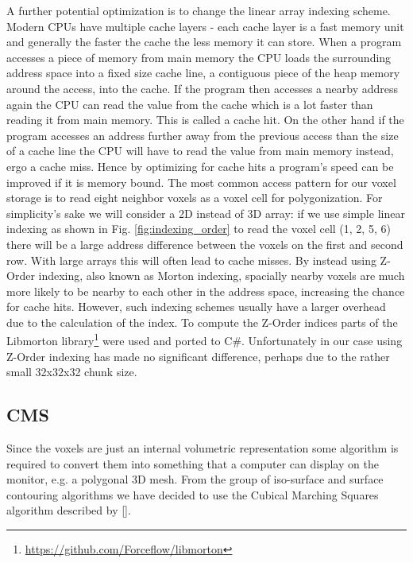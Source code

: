 A further potential optimization is to change the linear array indexing scheme. Modern CPUs have multiple cache layers - each cache layer is a fast memory unit and generally the faster the cache the less
memory it can store. When a program accesses a piece of memory from main memory the CPU loads the surrounding address space into a fixed size cache line, a contiguous piece of the heap memory around the access, into the cache.
If the program then accesses a nearby address again the CPU can read the value from the cache which is a lot faster than reading it from main memory. This is called a cache hit. On the other hand if the program accesses an address further away from the previous access than the size of a cache line the CPU will have to read the value from main memory instead, ergo a cache miss. Hence by optimizing for cache hits a program's speed can be improved if it is memory bound. The most
common access pattern for our voxel storage is to read eight neighbor voxels as a voxel cell for polygonization.
For simplicity's sake we will consider a 2D instead of 3D array: if we use simple linear indexing as shown in Fig. \ref{fig:indexing_order} to read the voxel cell (1, 2, 5, 6) there will be a large address difference between the voxels
on the first and second row. With large arrays this will often lead to cache misses. By instead using Z-Order indexing, also known as Morton indexing, spacially nearby voxels are much more likely to be nearby to each other in the address space, increasing the chance for cache hits. However, such indexing schemes usually have a larger overhead due to the calculation of the index. To compute the Z-Order indices parts of the Libmorton library\footnote{\url{https://github.com/Forceflow/libmorton}} were used and ported to C\#. Unfortunately in our case using Z-Order indexing has made no significant difference, perhaps due to the rather small 32x32x32 chunk size.


\subsection{CMS}

Since the voxels are just an internal volumetric representation some algorithm is required to convert them into something that a computer can
display on the monitor, e.g. a polygonal 3D mesh. From the group of iso-surface and surface contouring algorithms we have decided to use the
Cubical Marching Squares algorithm described by [].

